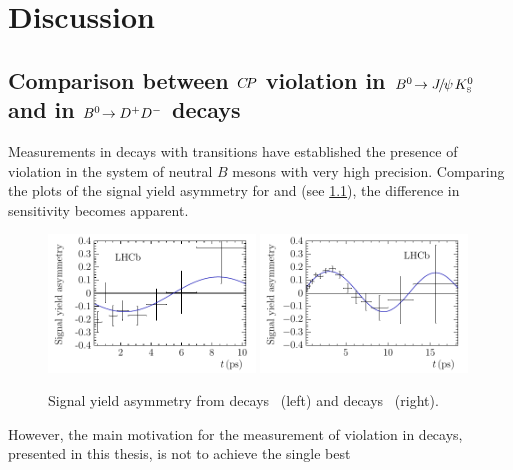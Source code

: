 
\chapter{Discussion}
\label{sec:discussion}



\section{Comparison between \texorpdfstring{${C\!P}$}{CP} violation in
\texorpdfstring{\mbox{${{B}^0}\!\rightarrow {\ensuremath{{J\mskip -3mu/\mskip -2mu\psi\mskip 2mu}}}{\ensuremath{{K}^0_{\mathrm{ \scriptscriptstyle S}}}}$}}{Bd2JPsiKS} and in
\texorpdfstring{\mbox{${{B}^0}\!\rightarrow {\ensuremath{{D}^+}}{\ensuremath{{D}^-}}$}}{Bd2DD} decays}
\label{sec:discussion:JpsiKS_DD_comparison}

Measurements in decays with \bToccbars transitions have established the
presence of \CP violation in the system of neutral $B$ mesons with very high
precision. Comparing the plots of the signal yield asymmetry for \BdToJPsiKS
and \BdToDD (see \cref{fig:discussion:asymmetry}), the difference in
sensitivity becomes apparent.
\begin{figure}[hbt]
\centering
\includegraphics[width=0.49\textwidth]{08-Discussion/tikz/pdf/Asymmetry_B2DD.pdf}
\includegraphics[width=0.49\textwidth]{08-Discussion/tikz/pdf/Asymmetry_B2JPsiKS.pdf}
\caption{Signal yield asymmetry from \BdToDD decays~\cite{LHCb-PAPER-2016-037} (left)
and \BdToJPsiKS decays~\cite{LHCb-PAPER-2015-004} (right).}
\label{fig:discussion:asymmetry}
\end{figure}
However, the main motivation for the measurement of \CP violation in \BdToDD
decays, presented in this thesis, is not to achieve the single best
